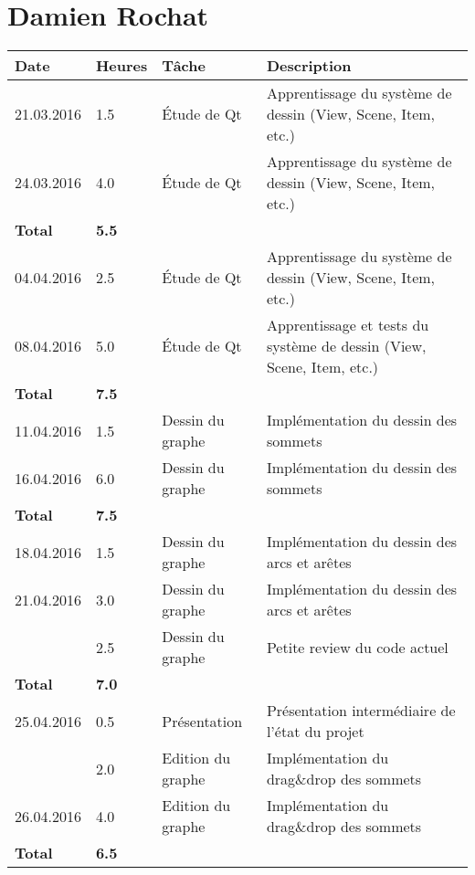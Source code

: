 \documentclass[french]{article}
\begin{document}
	\section*{Damien Rochat}
	\begin{longtable}{p{}|p{}|p{}|p{}}
		Date & Heures & Tâche & Description \\
		\hline \hline
		
		21.03.2016 & 1.5 & Étude de Qt & Apprentissage du système de dessin (View, Scene, Item, etc.) \\
		24.03.2016 & 4.0 & Étude de Qt & Apprentissage du système de dessin (View, Scene, Item, etc.) \\
		\textbf{Total} & \textbf{5.5} && \\
		\hline
		
		04.04.2016 & 2.5 & Étude de Qt & Apprentissage du système de dessin (View, Scene, Item, etc.) \\
		08.04.2016 & 5.0 & Étude de Qt & Apprentissage et tests du système de dessin (View, Scene, Item, etc.) \\
		\textbf{Total} & \textbf{7.5} && \\
		\hline
		
		11.04.2016 & 1.5 & Dessin du graphe & Implémentation du dessin des sommets \\
		16.04.2016 & 6.0 & Dessin du graphe & Implémentation du dessin des sommets \\
		\textbf{Total} & \textbf{7.5} && \\
		\hline

		18.04.2016 & 1.5 & Dessin du graphe & Implémentation du dessin des arcs et arêtes \\
		21.04.2016 & 3.0 & Dessin du graphe & Implémentation du dessin des arcs et arêtes \\
		           & 2.5 & Dessin du graphe & Petite review du code actuel \\
		\textbf{Total} & \textbf{7.0} && \\
		\hline

		25.04.2016 & 0.5 & Présentation & Présentation intermédiaire de l'état du projet \\
		           & 2.0 & Edition du graphe & Implémentation du drag\&drop des sommets \\
		26.04.2016 & 4.0 & Edition du graphe & Implémentation du drag\&drop des sommets \\
		\textbf{Total} & \textbf{6.5} && \\
		\hline


\end{longtable}
\end{document}
